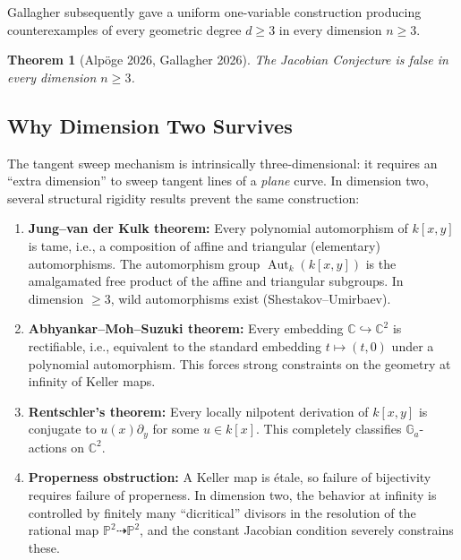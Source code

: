 \documentclass[12pt,a4paper]{article}
\newtheorem{theorem}{Theorem}[section]
\theoremstyle{definition}
\newcommand{\CC}{\mathbb{C}}
\newcommand{\kk}{k}
\newcommand{\Aut}{\operatorname{Aut}}
\newcommand{\Ga}{\mathbb{G}_a}
\begin{document}
Gallagher \cite{Gallagher2026} subsequently gave a uniform one-variable construction
producing counterexamples of every geometric degree $d \geq 3$ in every dimension $n \geq 3$.

\begin{theorem}[Alp\"oge 2026, Gallagher 2026]
The Jacobian Conjecture is false in every dimension $n \geq 3$.
\end{theorem}

\subsection{Why Dimension Two Survives}

The tangent sweep mechanism is intrinsically three-dimensional: it requires an ``extra
dimension'' to sweep tangent lines of a \emph{plane} curve. In dimension two, several
structural rigidity results prevent the same construction:

\begin{enumerate}[label=(\roman*)]
\item \textbf{Jung--van der Kulk theorem:} Every polynomial automorphism of $\kk[x,y]$ is
tame, i.e., a composition of affine and triangular (elementary) automorphisms. The
automorphism group $\Aut_\kk(\kk[x,y])$ is the amalgamated free product of the affine and
triangular subgroups. In dimension $\geq 3$, wild automorphisms exist
(Shestakov--Umirbaev).

\item \textbf{Abhyankar--Moh--Suzuki theorem:} Every embedding $\CC \hookrightarrow \CC^2$
is rectifiable, i.e., equivalent to the standard embedding $t \mapsto (t,0)$ under a
polynomial automorphism. This forces strong constraints on the geometry at infinity of
Keller maps.

\item \textbf{Rentschler's theorem:} Every locally nilpotent derivation of $\kk[x,y]$ is
conjugate to $u(x)\partial_y$ for some $u \in \kk[x]$. This completely classifies
$\Ga$-actions on $\CC^2$.

\item \textbf{Properness obstruction:} A Keller map is \'etale, so failure of bijectivity
requires failure of properness. In dimension two, the behavior at infinity is controlled
by finitely many ``dicritical'' divisors in the resolution of the rational map
$\mathbb{P}^2 \dashrightarrow \mathbb{P}^2$, and the constant Jacobian condition
severely constrains these.
\end{enumerate}
\end{document}
